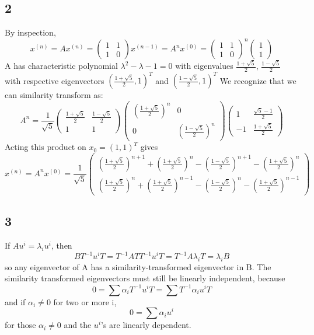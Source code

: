 \documentclass{article}
\begin{document}
\subsection*{2}
By inspection,
$$x^{(n)} = Ax^{(n)} = \begin{pmatrix}1&1\\1&0\end{pmatrix}x^{(n-1)} = A^nx^{(0)}=\begin{pmatrix}1&1\\1&0\end{pmatrix}^n\begin{pmatrix}1\\1\end{pmatrix}$$
A has characteristic polynomial $\lambda^2-\lambda-1=0$ with eigenvalues $\frac{1+\sqrt{5}}{2}$, $\frac{1-\sqrt{5}}{2}$ with respective eigenvectors $(\frac{1+\sqrt{5}}{2},1)^T$ and $(\frac{1-\sqrt{5}}{2},1)^T$
We recognize that we can similarity transform as:
$$A^n = \frac{1}{\sqrt{5}}\begin{pmatrix}\frac{1+\sqrt{5}}{2}&\frac{1-\sqrt{5}}{2}\\1&1\end{pmatrix}\begin{pmatrix}(\frac{1+\sqrt{5}}{2})^n&0\\0&(\frac{1-\sqrt{5}}{2})^n\end{pmatrix}\begin{pmatrix}1&\frac{\sqrt{5}-1}{2}\\-1&\frac{1+\sqrt{5}}{2}\end{pmatrix}$$
Acting this product on $x_0 = (1,1)^T$ gives
$$x^{(n)} = A^nx^{(0)} = \frac{1}{\sqrt{5}}\begin{pmatrix}(\frac{1+\sqrt{5}}{2})^{n+1}+(\frac{1+\sqrt{5}}{2})^{n}- (\frac{1-\sqrt{5}}{2})^{n+1}-(\frac{1+\sqrt{5}}{2})^n\\ (\frac{1+\sqrt{5}}{2})^{n}+(\frac{1+\sqrt{5}}{2})^{n-1}- (\frac{1-\sqrt{5}}{2})^{n}-(\frac{1+\sqrt{5}}{2})^{n-1}\end{pmatrix}$$
\subsection*{3}  If $Au^i=\lambda_iu^i$, then $$BT^{-1}u^iT=T^{-1}ATT^{-1}u^iT=T^{-1}A\lambda_iT = \lambda_iB$$ so any eigenvector of A has a similarity-transformed eigenvector in B.  The similarity transformed eigenvectors must still be linearly independent, because 
$$0 = \sum \alpha_iT^{-1}u^iT = \sum T^{-1}\alpha_iu^iT$$
and if $\alpha_i\neq 0$ for two or more i, 
$$0 = \sum \alpha_iu^i$$
for those $\alpha_i\neq 0$ and the $u^i$'s are linearly dependent.
\end{document}
